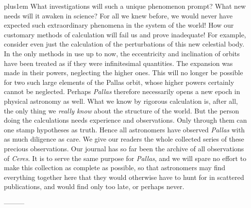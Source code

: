 \begingroup\rightskip=0pt plus1em\relax
What investigations will such a unique phenomenon prompt? What new needs will it awaken in science? For all we knew before, we would never have expected such extraordinary phenomena in the system of the world! How our customary methods of calculation will fail us and prove inadequate! For example, consider even just the calculation of the perturbations of this new celestial body. In the only methods in use up to now, the eccentricity and inclination of orbits have been treated as if they were infinitesimal quantities. The expansion was made in their powers, neglecting the higher ones. This will no longer be possible for two such large elements of the Pallas orbit, whose higher powers certainly cannot be neglected. Perhaps \textit{Pallas} therefore necessarily opens a new epoch in physical astronomy as well. What we know by rigorous calculation is, after all, the only thing we \textit{really know} about the structure of the world. But the person doing the calculations needs experience and observations. Only through them can one stamp hypotheses as truth. Hence all astronomers have observed \textit{Pallas} with as much diligence as care. We give our readers the whole collected series of these precious observations. Our journal has so far been the archive of all observations of \textit{Ceres}. It is to serve the same purpose for \textit{Pallas}, and we will spare no effort to make this collection as complete as possible, so that astronomers may find everything together here that they would otherwise have to hunt for in scattered publications, and would find only too late, or perhaps never.\par\endgroup

—\quad —\quad —

